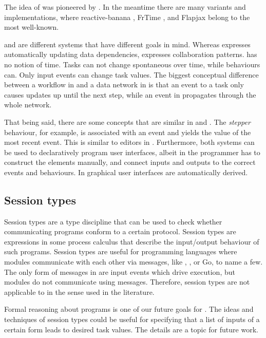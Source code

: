 The idea of \FRP was pioneered by \citet{conf/icfp/ElliottH97}.
In the meantime there are many variants and implementations, where reactive-banana \cite{reactive-banana}, FrTime \cite{CooperK04}, and Flapjax \cite{conf/oopsla/MeyerovichGBCGBK09} belong to the most well-known.

\FRP and \TOP are different systems that have different goals in mind.
Whereas \FRP expresses automatically updating data dependencies, \TOP expresses collaboration patterns.
\TOP has no notion of time.
Tasks can not change spontaneous over time, while behaviours can.
Only input events can change task values.
The biggest conceptual difference between a workflow in \TOP and a data network in \FRP is that an event to a task only causes updates up until the next step, while an event in \FRP propagates through the whole network.

That being said, there are some concepts that are similar in \TOP and \FRP.
The \emph{stepper} behaviour, for example, is associated with an event and yields the value of the most recent event.
This is similar to editors in \TOP.
Furthermore, both systems can be used to declaratively program user interfaces, albeit in \FRP the programmer has to construct the \GUI elements manually, and connect inputs and outputs to the correct events and behaviours.
In \TOP graphical user interfaces are automatically derived.



\subsection{Session types}

Session types are a type discipline that can be used to check whether communicating programs conform to a certain protocol.
Session types are expressions in some process calculus that describe the input/output behaviour of such programs.
Session types are useful for programming languages where modules communicate with each other via messages, like \CSP, \PICALC, or Go, to name a few.
The only form of messages in \TOP are input events which drive execution, but modules do not communicate using messages.
Therefore, session types are not applicable to \TOP in the sense used in the literature.

Formal reasoning about \TOP programs is one of our future goals for \TOPHAT.
The ideas and techniques of session types could be useful for specifying that a list of inputs of a certain form leads to desired task values.
The details are a topic for future work.



